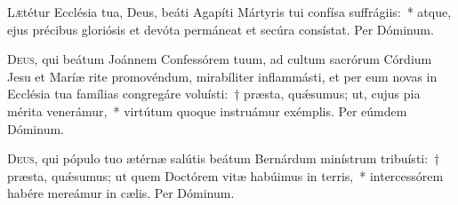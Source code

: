 \documentclass[vesperale_romanum.tex]{subfiles}
\begin{document}

\semiduplex



\oratio
\lettrine{L}{æ}tétur Ecclésia tua, Deus, beáti Agapíti Mártyris tui confísa suffrágiis:~* atque, ejus précibus gloriósis et devóta permáneat et secúra consístat. Per Dóminum.


\myrule


\duplex
\oratio

\lettrine{D}{eus}, qui beátum Joánnem Confessórem tuum, ad cultum sacrórum Córdium Jesu et Maríæ rite promovéndum, mirabíliter inflammásti, et per eum novas in Ecclésia tua famílias congregáre voluísti:~† præsta, quǽsumus; ut, cujus pia mérita venerámur,~* virtútum quoque instruámur exémplis.
Per eúmdem Dóminum.


\myrule

\newpage

\duplex


\oratio

\lettrine{D}{eus}, qui pópulo tuo ætérnæ salútis beátum Bernárdum minístrum tribuísti:~† præsta, quǽsumus; ut quem Doctórem vitæ habúimus in terris,~* intercessórem habére mereámur in cælis.
Per Dóminum.



\myrule
\end{document}
